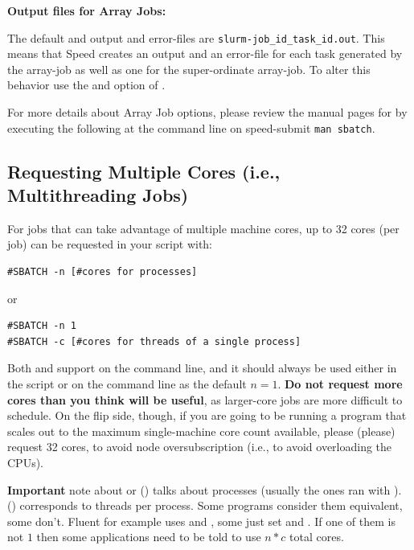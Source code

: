 \textbf{Output files for Array Jobs:}

The default and output and error-files are
\texttt{slurm-job\_id\_task\_id.out}.
%
This means that Speed creates an output and an error-file for each task 
generated by the array-job as well as one for the super-ordinate array-job. 
To alter this behavior use the  and  option of
. 

For more details about Array Job options, please review the manual pages for 
 by executing the following at the command line on speed-submit 
\texttt{man sbatch}.
 
\subsection{Requesting Multiple Cores (i.e., Multithreading Jobs)}

For jobs that can take advantage of multiple machine cores, up to 32 cores
(per job) can be requested in your script with: 

\begin{verbatim}
#SBATCH -n [#cores for processes] 
\end{verbatim}

or

\begin{verbatim}
#SBATCH -n 1
#SBATCH -c [#cores for threads of a single process]
\end{verbatim}

Both  and  support  on the command line,
and it should always be used either in the script or on the command line as the
default $n=1$.
\textbf{Do not request more cores than you think will be useful}, as larger-core
jobs are more difficult to schedule. On the flip side, though, if you 
are going to be running a program that scales out to the maximum single-machine
core count available, please (please) request 32 cores, to avoid node 
oversubscription (i.e., to avoid overloading the CPUs).

\textbf{Important} note about  or 
() talks about processes (usually the ones ran with ).
 () corresponds to threads per process.
Some programs consider them equivalent, some don't. Fluent for example
uses  and ,
some just set  and .
If one of them is not $1$ then some applications need to be told to
use $n*c$ total cores.


